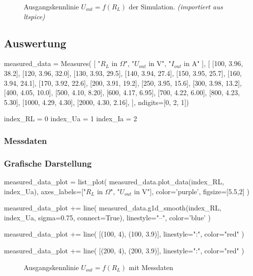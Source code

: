 \begin{figure}[H]
    \centering
    \caption{Ausgangskennlinie \textbf{$U_{out} = f(R_L)$} der Simulation. \textit{(importiert aus ltspice)}}
\end{figure}

\subsection{Auswertung}

\begin{sagesilent}
    measured_data = Measures(
        [
            "$R_L$ in $\Omega$",
            "$U_{out}$ in V", 
            "$I_{out}$ in A"
        ], [
            [100, 3.96, 38.2],
            [120, 3.96, 32.0],
            [130, 3.93, 29.5],
            [140, 3.94, 27.4],
            [150, 3.95, 25.7],
            [160, 3.94, 24.1],
            [170, 3.92, 22.6],
            [200, 3.91, 19.2],
            [250, 3.95, 15.6],
            [300, 3.98, 13.2],
            [400, 4.05, 10.0],
            [500, 4.10, 8.20],
            [600, 4.17, 6.95],
            [700, 4.22, 6.00],
            [800, 4.23, 5.30],
            [1000, 4.29, 4.30],
            [2000, 4.30, 2.16],
    ], ndigits=[0, 2, 1])

    index_RL = 0
    index_Ua = 1
    index_Ia = 2
\end{sagesilent}

\subsubsection{Messdaten}

\begin{table}[H]
    \centering
    \renewcommand{\arraystretch}{1.2}
\end{table}

\subsubsection{Grafische Darstellung}

\begin{sagesilent}
    measured_data_plot = list_plot(
        measured_data.plot_data(index_RL, index_Ua),
        axes_labels=["$R_L$ in $\Omega$", "$U_{out}$ in V"],
        color='purple',
        figsize=[5.5,2]
    )

    measured_data_plot += line(
        measured_data.g1d_smooth(index_RL, index_Ua, sigma=0.75, connect=True),
        linestyle="--",
        color='blue'
    )

    measured_data_plot += line(
        [(100, 4), (100, 3.9)],
        linestyle=":",
        color="red"
    )

    measured_data_plot += line(
        [(200, 4), (200, 3.9)],
        linestyle=":",
        color="red"
    )
\end{sagesilent}

\begin{figure}[H]
    \centering
    \caption{Ausgangskennlinie \textbf{$U_{out} = f(R_L)$} mit Messdaten}
\end{figure}
